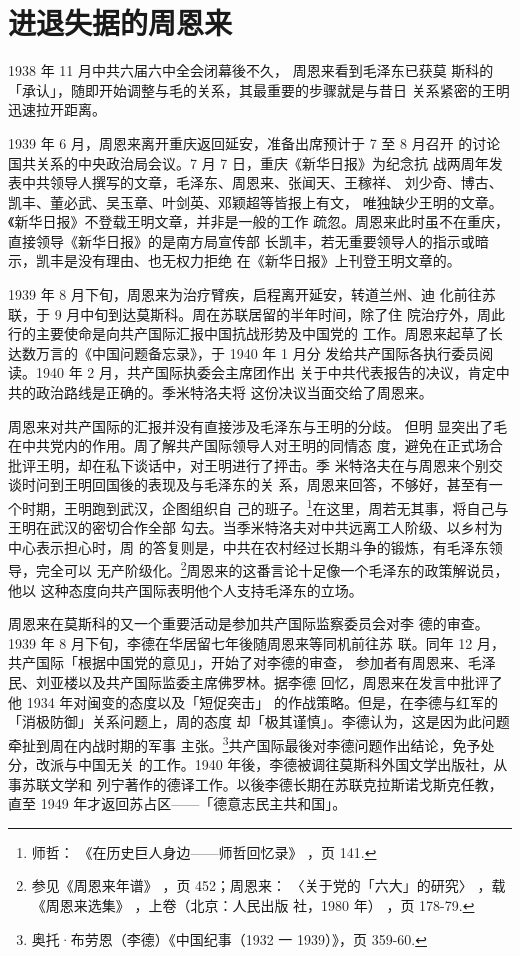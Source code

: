 \section{进退失据的周恩来}
1938 年 11 月中共六届六中全会闭幕後不久，
周恩来看到毛泽东已获莫
斯科的「承认」，随即开始调整与毛的关系，其最重要的步骤就是与昔日
关系紧密的王明迅速拉开距离。

1939 年 6 月，周恩来离开重庆返回延安，准备出席预计于 7 至 8 月召开
的讨论国共关系的中央政治局会议。7 月 7 日，重庆《新华日报》为纪念抗
战两周年发表中共领导人撰写的文章，毛泽东、周恩来、张闻天、王稼祥、
刘少奇、博古、凯丰、董必武、吴玉章、叶剑英、邓颖超等皆报上有文，
唯独缺少王明的文章。《新华日报》不登载王明文章，并非是一般的工作
疏忽。周恩来此时虽不在重庆，直接领导《新华日报》的是南方局宣传部
长凯丰，若无重要领导人的指示或暗示，凯丰是没有理由、也无权力拒绝
在《新华日报》上刊登王明文章的。

1939 年 8 月下旬，周恩来为治疗臂疾，启程离开延安，转道兰州、迪
化前往苏联，于 9 月中旬到达莫斯科。周在苏联居留的半年时间，除了住
院治疗外，周此行的主要使命是向共产国际汇报中国抗战形势及中国党的
工作。周恩来起草了长达数万言的《中国问题备忘录》，于 1940 年 1 月分
发给共产国际各执行委员阅读。1940 年 2 月，共产国际执委会主席团作出
关于中共代表报告的决议，肯定中共的政治路线是正确的。季米特洛夫将
这份决议当面交给了周恩来。

周恩来对共产国际的汇报并没有直接涉及毛泽东与王明的分歧。
但明
显突出了毛在中共党内的作用。周了解共产国际领导人对王明的同情态
度，避免在正式场合批评王明，却在私下谈话中，对王明进行了抨击。季
米特洛夫在与周恩来个别交谈时问到王明回国後的表现及与毛泽东的关
系，周恩来回答，不够好，甚至有一个时期，王明跑到武汉，企图组织自
己的班子。\footnote{师哲：
《在历史巨人身边——师哲回忆录》
，页 141. }在这里，周若无其事，将自己与王明在武汉的密切合作全部
勾去。当季米特洛夫对中共远离工人阶级、以乡村为中心表示担心时，周
的答复则是，中共在农村经过长期斗争的锻炼，有毛泽东领导，完全可以
无产阶级化。\footnote{参见《周恩来年谱》
，页 452；周恩来：
〈关于党的「六大」的研究〉
，载《周恩来选集》
，上卷（北京：人民出版
社，1980 年）
，页 178-79.}周恩来的这番言论十足像一个毛泽东的政策解说员，他以
这种态度向共产国际表明他个人支持毛泽东的立场。

周恩来在莫斯科的又一个重要活动是参加共产国际监察委员会对李
德的审查。1939 年 8 月下旬，李德在华居留七年後随周恩来等同机前往苏
联。同年 12 月，共产国际「根据中国党的意见」，开始了对李德的审查，
参加者有周恩来、毛泽民、刘亚楼以及共产国际监委主席佛罗林。据李德
回忆，周恩来在发言中批评了他 1934 年对闽变的态度以及「短促突击」
的作战策略。但是，在李德与红军的「消极防御」关系问题上，周的态度
却「极其谨慎」。李德认为，这是因为此问题牵扯到周在内战时期的军事
主张。\footnote{奥托·布劳恩（李德）《中国纪事（1932 一 1939）》，页 359-60.}共产国际最後对李德问题作出结论，免予处分，改派与中国无关
的工作。1940 年後，李德被调往莫斯科外国文学出版社，从事苏联文学和
列宁著作的德译工作。以後李德长期在苏联克拉斯诺戈斯克任教，直至
1949 年才返回苏占区——「德意志民主共和国」。

